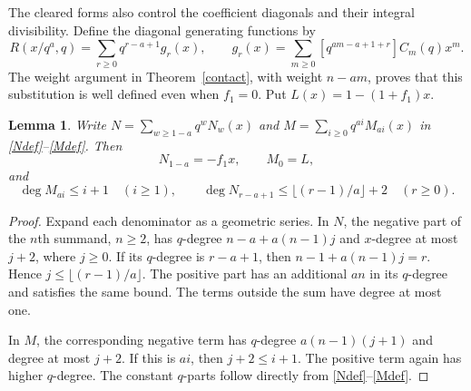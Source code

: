 \documentclass[11pt]{amsart}
\newtheorem{lemma}[theorem]{Lemma}
\theoremstyle{definition}
\theoremstyle{remark}
\numberwithin{equation}{section}
\begin{document}
The cleared forms also control the coefficient diagonals and their integral divisibility.
Define the diagonal generating functions by
\begin{equation}\label{Gdef}
 R(x/q^a,q)=\sum_{r\ge0}q^{r-a+1}g_r(x),\qquad
 g_r(x)=\sum_{m\ge0}[q^{am-a+1+r}]C_m(q)x^m.
\end{equation}
The weight argument in Theorem~\ref{contact}, with weight $n-am$, proves that this substitution is well defined even when $f_1=0$. Put $L(x)=1-(1+f_1)x$.

\begin{lemma}\label{degreelemma}
Write $N=\sum_{w\ge1-a}q^wN_w(x)$ and $M=\sum_{i\ge0}q^{ai}M_{ai}(x)$ in \eqref{Ndef}--\eqref{Mdef}. Then
\[
 N_{1-a}=-f_1x,\qquad M_0=L,
\]
and
\begin{equation}\label{degreebounds}
 \deg M_{ai}\le i+1\quad(i\ge1),\qquad
 \deg N_{r-a+1}\le\lfloor(r-1)/a\rfloor+2\quad(r\ge0).
\end{equation}
\end{lemma}
\begin{proof}
Expand each denominator as a geometric series. In $N$, the negative part of the $n$th summand, $n\ge2$, has $q$-degree $n-a+a(n-1)j$ and $x$-degree at most $j+2$, where $j\ge0$. If its $q$-degree is $r-a+1$, then $n-1+a(n-1)j=r$. Hence $j\le\lfloor(r-1)/a\rfloor$. The positive part has an additional $an$ in its $q$-degree and satisfies the same bound. The terms outside the sum have degree at most one.

In $M$, the corresponding negative term has $q$-degree $a(n-1)(j+1)$ and degree at most $j+2$. If this is $ai$, then $j+2\le i+1$. The positive term again has higher $q$-degree. The constant $q$-parts follow directly from \eqref{Ndef}--\eqref{Mdef}.
\end{proof}
\end{document}
